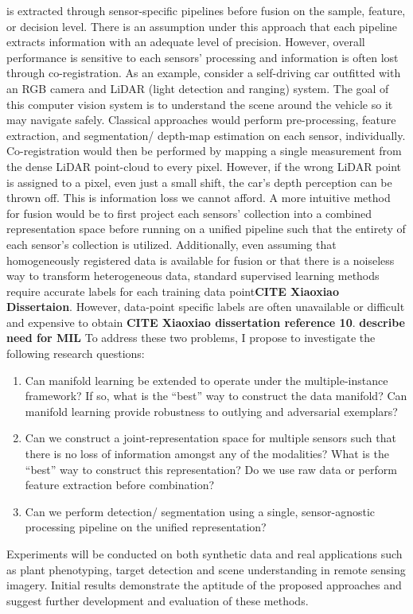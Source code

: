 \newpage is extracted through sensor-specific pipelines before fusion on the sample, feature, or decision level.  There is an assumption under this approach that each pipeline extracts information with an adequate level of precision.  However, overall performance is sensitive to each sensors' processing and information is often lost through co-registration.  As an example, consider a self-driving car outfitted with an RGB camera and LiDAR (light detection and ranging) system. The goal of this computer vision system is to understand the scene around the vehicle so it may navigate safely.  Classical approaches would perform pre-processing, feature extraction, and segmentation/ depth-map estimation on each sensor, individually.  Co-registration would then be performed by mapping a single measurement from the dense LiDAR point-cloud to every pixel.  However, if the wrong LiDAR point is assigned to a pixel, even just a small shift, the car's depth perception can be thrown off.  This is information loss we cannot afford.  A more intuitive method for fusion would be to first project each sensors' collection into a combined representation space before running on a unified pipeline such that the entirety of each sensor's collection is utilized. 
\newline
Additionally, even assuming that homogeneously registered data is available for fusion or that there is a noiseless way to transform heterogeneous  data, standard supervised learning methods require accurate labels for each training data point\textbf{CITE Xiaoxiao Dissertaion}.  However, data-point specific labels are often unavailable or difficult and expensive to obtain \textbf{CITE Xiaoxiao dissertation reference 10}. 
\textbf{describe need for MIL}
\newline
To address these two problems, I propose to investigate the following research questions:
\begin{enumerate}
	\item Can manifold learning be extended to operate under the multiple-instance framework? If so, what is the ``best'' way to construct the data manifold?  Can manifold learning provide robustness to outlying and adversarial exemplars?
	\item Can we construct a joint-representation space for multiple sensors such that there is no loss of information amongst any of the modalities?  What is the ``best'' way to construct this representation?  Do we use raw data or perform feature extraction before combination?
	\item Can we perform detection/ segmentation using a single, sensor-agnostic processing pipeline on the unified representation?
\end{enumerate} 

Experiments will be conducted on both synthetic data and real applications such as plant phenotyping, target detection and scene understanding in remote sensing imagery. Initial results demonstrate the aptitude of the proposed approaches and suggest further development and evaluation of these methods.
